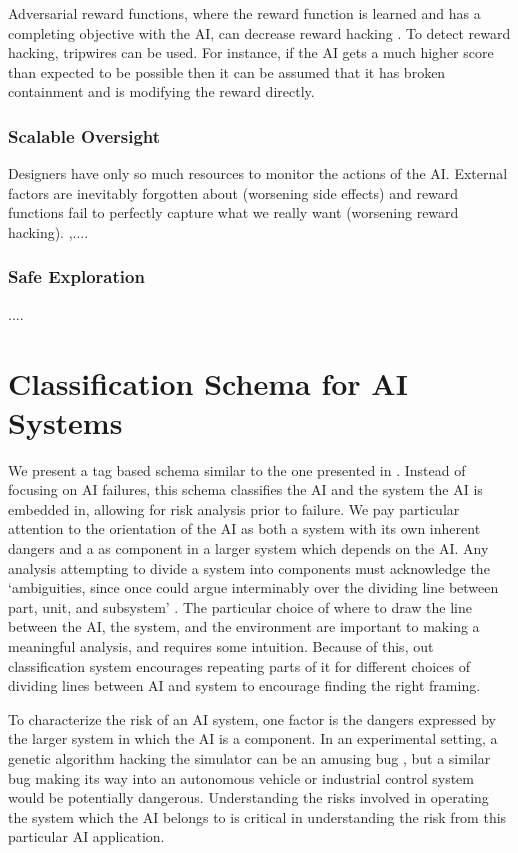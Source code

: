 \documentclass[11pt]{article}
\begin{document}
Adversarial reward functions, where the reward function is learned and has a completing objective
with the AI, can decrease reward hacking \cite{fu2018adversarial}. To detect reward hacking,
tripwires can be used. For instance, if the AI gets a much higher score than expected to be possible 
then it can be assumed that it has broken containment and is modifying the reward directly.

\subsubsection{Scalable Oversight}

Designers have only so much resources to monitor the actions of the AI. External factors are
inevitably forgotten about (worsening side effects) and reward functions fail to perfectly
capture what we really want (worsening reward hacking).
,....

\subsubsection{Safe Exploration}

....


\newpage
\section{Classification Schema for AI Systems}
\label{sec:classification}

We present a tag based schema similar to the one presented in \cite{scott2020classification}.
Instead of focusing on AI failures, this schema classifies the AI and the system the AI is embedded
in, allowing for risk analysis prior to failure. We pay
particular attention to the orientation of the AI as both a system with its own inherent dangers
and a as component in a larger system which depends on the AI. Any
analysis attempting to divide a system into components must acknowledge the `ambiguities, since once
could argue interminably over the dividing line between part, unit, and subsystem'
\cite{perrow1984living}. The particular choice of where to draw the line between the AI, the system,
and the environment are important to making a meaningful analysis, and requires some intuition.
Because of this, out classification system encourages repeating parts of it for different choices of
dividing lines between AI and system to encourage finding the right framing.

To characterize the risk of an AI system, one factor is the dangers expressed by the
larger system in which the AI is a component. In an experimental setting, a genetic algorithm
hacking the simulator can be an amusing bug \cite{lehman2018surprising}, but a similar bug making
its way into an autonomous vehicle or industrial control system would be potentially
dangerous. Understanding the risks involved in operating the system which the AI belongs to is
critical in understanding the risk from this particular AI application.
\end{document}
